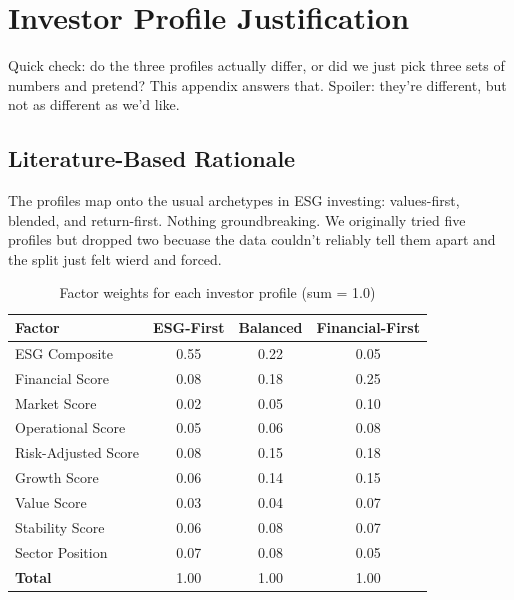 \chapter{Investor Profile Justification}
\label{app:profiles}
Quick check: do the three profiles actually differ, or did we just pick three sets of numbers and pretend? This appendix answers that. Spoiler: they're different, but not as different as we'd like.
\section{Literature-Based Rationale}\label{sec:profile_lit}
The profiles map onto the usual archetypes in ESG investing: values-first, blended, and return-first. Nothing groundbreaking. We originally tried five profiles but dropped two becuase the data couldn't reliably tell them apart and the split just felt wierd and forced.
\begin{table}[!htbp]
\centering
\caption{Factor weights for each investor profile (sum = 1.0)}\label{tab:profile_weights}
\small
\begin{tabular}{@{}lccc@{}}
\toprule
\textbf{Factor} & \textbf{ESG-First} & \textbf{Balanced} & \textbf{Financial-First} \\
\midrule
ESG Composite & 0.55 & 0.22 & 0.05 \\ Financial Score & 0.08 & 0.18 & 0.25 \\ Market Score & 0.02 & 0.05 & 0.10 \\ Operational Score & 0.05 & 0.06 & 0.08 \\ Risk-Adjusted Score & 0.08 & 0.15 & 0.18 \\ Growth Score & 0.06 & 0.14 & 0.15 \\ Value Score & 0.03 & 0.04 & 0.07 \\ Stability Score & 0.06 & 0.08 & 0.07 \\ Sector Position & 0.07 & 0.08 & 0.05 \\
\midrule
\textbf{Total} & 1.00 & 1.00 & 1.00 \\
\bottomrule
\end{tabular}
\end{table}
